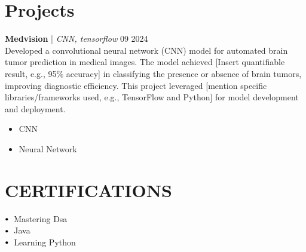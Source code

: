 \documentclass[letterpaper,11pt]{article}
\newcommand\sbullet[1][.5]{\mathbin{\vcenter{\hbox{\scalebox{#1}{$\bullet$}}}}}
\begin{document}
\section*{Projects}
\textbf{Medvision} \href{https://github.com/Priyanshu98156/MedVision}{\faExternalLink} | \textit{CNN, tensorflow} \hfill 09 2024 \\[2pt]
Developed a convolutional neural network (CNN) model for automated brain tumor prediction in medical images.  The model achieved [Insert quantifiable result, e.g.,  95\% accuracy] in classifying the presence or absence of brain tumors, improving diagnostic efficiency.  This project leveraged [mention specific libraries/frameworks used, e.g., TensorFlow and Python] for model development and deployment. \\[4pt]
\begin{itemize}[leftmargin=*]
\item CNN
\item Neural Network
\end{itemize}



\section{CERTIFICATIONS}
$\sbullet[.75] \hspace{0.1cm}$ Mastering Dsa \\
$\sbullet[.75] \hspace{0.1cm}$ Java \\
$\sbullet[.75] \hspace{0.1cm}$ Learning Python \\
\end{document}
